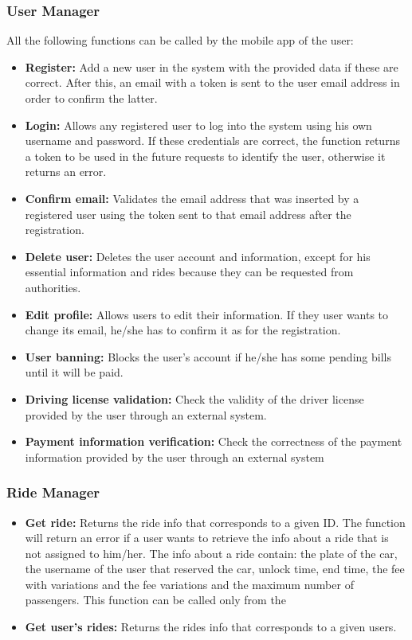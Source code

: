 \subsubsection{User Manager}
All the following functions can be called by the mobile app of the user:
\begin{itemize}
	\item \textbf{Register:} Add a new user in the system with the provided data if these are correct.
	After this, an email with a token is sent to the user email address in order to confirm the latter.
    \item \textbf{Login:} Allows any registered user to log into the system using his own username and password.
    If these credentials are correct, the function returns a token to be used in the future requests to identify the user, otherwise it returns an error.
    \item \textbf{Confirm email:} Validates the email address that was inserted by a registered user using the token sent to that email address after the registration.
    \item \textbf{Delete user:} Deletes the user account and information, except for his essential information and rides because they can be requested from authorities.
	\item \textbf{Edit profile:} Allows users to edit their information. If they user wants to change its email, he/she has to confirm it as for the registration.
	\item \textbf{User banning:} Blocks the user's account if he/she has some pending bills until it will be paid.
	\item \textbf{Driving license validation:} Check the validity of the driver license provided by the user through an external system.
	\item \textbf{Payment information verification:} Check the correctness of the payment information provided by the user through an external system
	
	
\end{itemize}

\subsubsection{Ride Manager}
\begin{itemize}
	\item \textbf{Get ride:} Returns the ride info that corresponds to a given ID. The function will return an error if a user wants to retrieve the info about a ride that is not assigned to him/her.
	The info about a ride contain: the plate of the car, the username of the user that reserved the car, unlock time, %
	end time, the fee with variations and the fee variations and the maximum number of passengers. This function can be called only from the 
	\item \textbf{Get user's rides:} Returns the rides info that corresponds to a given users.
\end{itemize}

